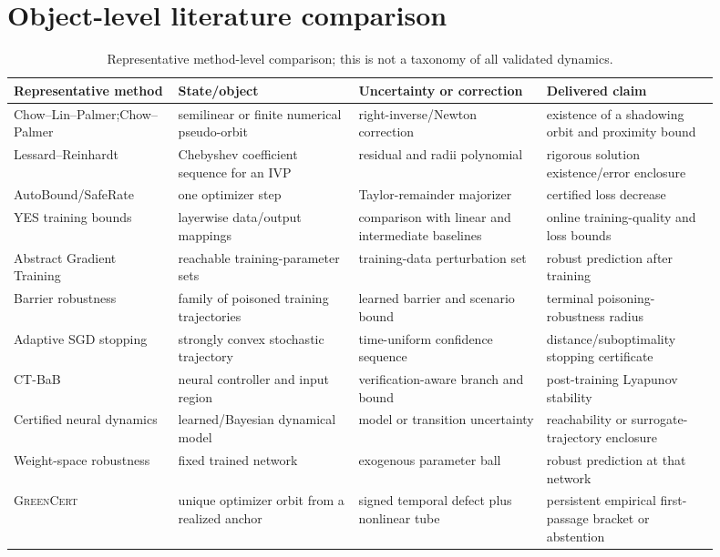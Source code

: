 \documentclass{article}
\newcommand{\method}{\textsc{GreenCert}}
\begin{document}
\ifdefined\arxivversion\else
\section{Object-level literature comparison}

\begin{table}[H]
\caption{Representative method-level comparison; this is not a taxonomy of all
validated dynamics.}
\label{tab:novelty}
\centering
\footnotesize
\setlength{\tabcolsep}{3.0pt}
\begin{tabular}{>{\raggedright\arraybackslash}p{0.21\linewidth}>{\raggedright\arraybackslash}p{0.23\linewidth}>{\raggedright\arraybackslash}p{0.24\linewidth}>{\raggedright\arraybackslash}p{0.22\linewidth}}
\toprule
Representative method & State/object & Uncertainty or correction & Delivered claim \\
\midrule
Chow--Lin--Palmer;\newline Chow--Palmer \citep{chow1989shadowing,chow1992numerical}
& semilinear or finite numerical pseudo-orbit
& right-inverse/Newton correction
& existence of a shadowing orbit and proximity bound \\
Lessard--Reinhardt \citep{lessard2014rigorous}
& Chebyshev coefficient sequence for an IVP
& residual and radii polynomial
& rigorous solution existence/error enclosure \\
AutoBound/SafeRate \citep{streeter2022autobound}
& one optimizer step
& Taylor-remainder majorizer
& certified loss decrease \\
YES training bounds \citep{yeganegi2024yes}
& layerwise data/output mappings
& comparison with linear and intermediate baselines
& online training-quality and loss bounds \\
Abstract Gradient Training \citep{sosnin2026agt}
& reachable training-parameter sets
& training-data perturbation set
& robust prediction after training \\
Barrier robustness \citep{taheri2026barc}
& family of poisoned training trajectories
& learned barrier and scenario bound
& terminal poisoning-robustness radius \\
Adaptive SGD stopping \citep{aolaritei2026stopping}
& strongly convex stochastic trajectory
& time-uniform confidence sequence
& distance/suboptimality stopping certificate \\
CT-BaB \citep{shi2026ctbab}
& neural controller and input region
& verification-aware branch and bound
& post-training Lyapunov stability \\
Certified neural dynamics \citep{wicker2021iterative,mathiesen2026certified}
& learned/Bayesian dynamical model
& model or transition uncertainty
& reachability or surrogate-trajectory enclosure \\
Weight-space robustness \citep{weng2020weight}
& fixed trained network
& exogenous parameter ball
& robust prediction at that network \\
\method{}
& unique optimizer orbit from a realized anchor
& signed temporal defect plus nonlinear tube
& persistent empirical first-passage bracket or abstention \\
\bottomrule
\end{tabular}
\end{table}
\fi
\end{document}
